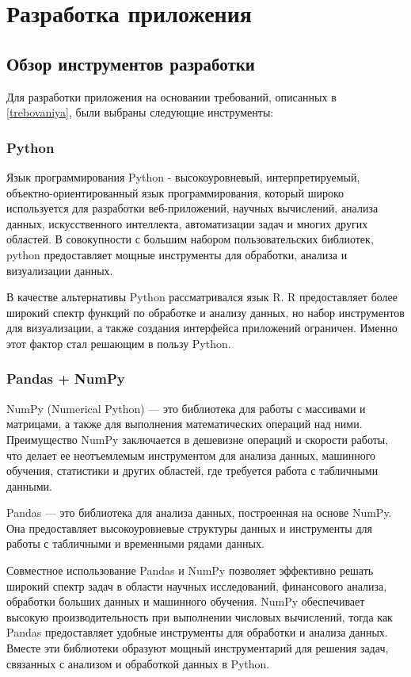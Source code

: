
\section{Разработка приложения}

\subsection{Обзор инструментов разработки}

Для разработки приложения на основании требований, описанных в \ref{trebovaniya}, были выбраны следующие инструменты:

\subsubsection{Python}

Язык программирования Python - высокоуровневый, интерпретируемый, объектно-ориентированный язык программирования, который широко используется для разработки веб-приложений, научных вычислений, анализа данных, искусственного интеллекта, автоматизации задач и многих других областей. В совокупности с большим набором пользовательских библиотек, python предоставляет мощные инструменты для обработки, анализа и визуализации данных. 

В качестве альтернативы Python рассматривался язык R. R предоставляет более широкий спектр функций по обработке и анализу данных, но набор инструментов для визуализации, а также создания интерфейса приложений ограничен. Именно этот фактор стал решающим в пользу Python.

\subsubsection{Pandas + NumPy}

NumPy (Numerical Python) --- это библиотека для работы с массивами и матрицами, а также для выполнения математических операций над ними. Преимущество NumPy заключается в дешевизне операций и скорости работы, что делает ее неотъемлемым инструментом для анализа данных, машинного обучения, статистики и других областей, где требуется работа с табличными данными.

Pandas --- это библиотека для анализа данных, построенная на основе NumPy. Она предоставляет высокоуровневые структуры данных и инструменты для работы с табличными и временными рядами данных.

Совместное использование Pandas и NumPy позволяет эффективно решать широкий спектр задач в области научных исследований, финансового анализа, обработки больших данных и машинного обучения. NumPy обеспечивает высокую производительность при выполнении числовых вычислений, тогда как Pandas предоставляет удобные инструменты для обработки и анализа данных. Вместе эти библиотеки образуют мощный инструментарий для решения задач, связанных с анализом и обработкой данных в Python.




